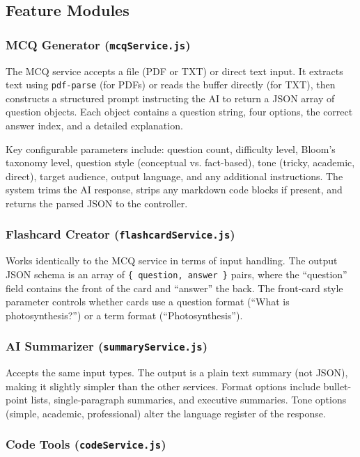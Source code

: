 \documentclass[12pt,a4paper]{article}
\begin{document}
\subsection{Feature Modules}

\subsubsection{MCQ Generator (\texttt{mcqService.js})}

The MCQ service accepts a file (PDF or TXT) or direct text input. It extracts text using \texttt{pdf-parse} (for PDFs) or reads the buffer directly (for TXT), then constructs a structured prompt instructing the AI to return a JSON array of question objects. Each object contains a question string, four options, the correct answer index, and a detailed explanation.

Key configurable parameters include: question count, difficulty level, Bloom's taxonomy level, question style (conceptual vs. fact-based), tone (tricky, academic, direct), target audience, output language, and any additional instructions. The system trims the AI response, strips any markdown code blocks if present, and returns the parsed JSON to the controller.

\subsubsection{Flashcard Creator (\texttt{flashcardService.js})}

Works identically to the MCQ service in terms of input handling. The output JSON schema is an array of \texttt{\{ question, answer \}} pairs, where the ``question'' field contains the front of the card and ``answer'' the back. The front-card style parameter controls whether cards use a question format (``What is photosynthesis?'') or a term format (``Photosynthesis'').

\subsubsection{AI Summarizer (\texttt{summaryService.js})}

Accepts the same input types. The output is a plain text summary (not JSON), making it slightly simpler than the other services. Format options include bullet-point lists, single-paragraph summaries, and executive summaries. Tone options (simple, academic, professional) alter the language register of the response.

\subsubsection{Code Tools (\texttt{codeService.js})}
\end{document}
